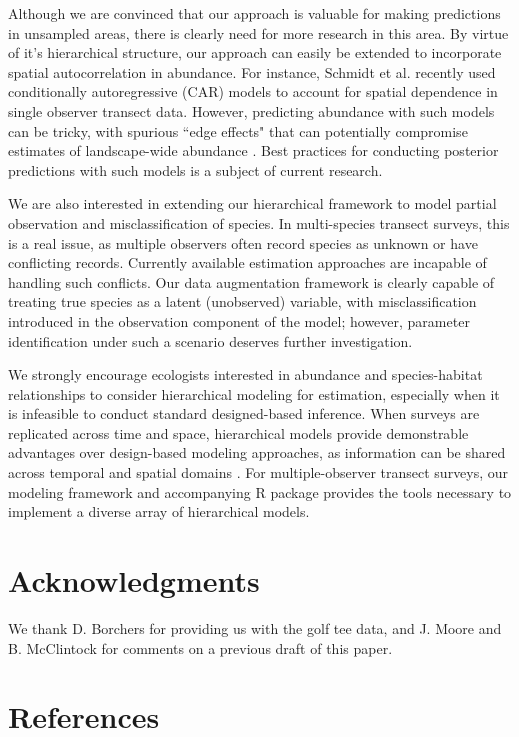 \documentclass[10pt]{article}
\begin{document}
Although we are convinced that our approach is valuable for making predictions in unsampled areas, there is clearly need for more research in this area.  By virtue of it's hierarchical structure, our approach can easily be extended to incorporate spatial autocorrelation in abundance.  For instance, Schmidt et al. \cite{SchmidtEtAl2012} recently used conditionally autoregressive (CAR) models to account for spatial dependence in single observer transect data.  However, predicting abundance with such models can be tricky, with spurious ``edge effects" that can potentially compromise estimates of landscape-wide abundance \cite{VerHoefJansen2007}.  Best practices for conducting posterior predictions with such models is a subject of current research.

We are also interested in extending our hierarchical framework to model partial observation and misclassification of species.  In multi-species transect surveys, this is a real issue, as multiple observers often record species as unknown or have conflicting records.  Currently available estimation approaches are incapable of handling such conflicts.  Our data augmentation framework is clearly capable of treating true species as a latent (unobserved) variable, with misclassification introduced in the observation component of the model; however, parameter identification under such a scenario deserves further investigation.

We strongly encourage ecologists interested in abundance and species-habitat relationships to consider hierarchical modeling for estimation, especially when it is infeasible to conduct standard designed-based inference.  When surveys are replicated across time and space, hierarchical models provide demonstrable advantages over design-based modeling approaches, as information can be shared across temporal and spatial domains \cite{RoyleEtAl2007,MooreBarlow2011}.  For multiple-observer transect surveys, our modeling framework and accompanying R package provides the tools necessary to implement a diverse array of hierarchical models.

\section*{Acknowledgments}
We thank D. Borchers for providing us with the golf tee data, and J. Moore and B. McClintock for comments on a previous draft of this paper.

\section*{References}

\clearpage
\end{document}
